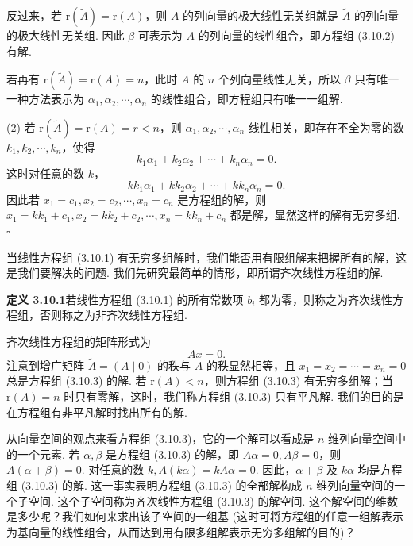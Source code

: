\documentclass[UTF8, 12pt, fontset=fandol, oneside]{ctexart}
\begin{document}
反过来，若 $\mathrm{r}(\widetilde{A})=\mathrm{r}(A)$，则 $A$ 的列向量的极大线性无关组就是 $\widetilde{A}$ 的列向量的极大线性无关组. 因此 $\beta$ 可表示为 $A$ 的列向量的线性组合，即方程组 (3.10.2) 有解.

若再有 $\mathrm{r}(\widetilde{A})=\mathrm{r}(A)=n$，此时 $A$ 的 $n$ 个列向量线性无关，所以 $\beta$ 只有唯一一种方法表示为 $\alpha_1,\alpha_2,\cdots,\alpha_n$ 的线性组合，即方程组只有唯一一组解.

(2) 若 $\mathrm{r}(\widetilde{A})=\mathrm{r}(A)=r<n$，则 $\alpha_1,\alpha_2,\cdots,\alpha_n$ 线性相关，即存在不全为零的数 $k_1,k_2,\cdots,k_n$，使得
\[
k_1\alpha_1+k_2\alpha_2+\cdots+k_n\alpha_n=0.
\]
这时对任意的数 $k$，
\[
kk_1\alpha_1+kk_2\alpha_2+\cdots+kk_n\alpha_n=0.
\]
因此若 $x_1=c_1,x_2=c_2,\cdots,x_n=c_n$ 是方程组的解，则 $x_1=kk_1+c_1,x_2=kk_2+c_2,\cdots,x_n=kk_n+c_n$ 都是解，显然这样的解有无穷多组. $\square$

当线性方程组 (3.10.1) 有无穷多组解时，我们能否用有限组解来把握所有的解，这是我们要解决的问题. 我们先研究最简单的情形，即所谓齐次线性方程组的解.

\noindent\textbf{定义 3.10.1}\quad 若线性方程组 (3.10.1) 的所有常数项 $b_i$ 都为零，则称之为齐次线性方程组，否则称之为非齐次线性方程组.

齐次线性方程组的矩阵形式为
\begin{equation}
Ax=0.
\tag{3.10.3}
\end{equation}
注意到增广矩阵 $\widetilde{A}=(A\mid 0)$ 的秩与 $A$ 的秩显然相等，且 $x_1=x_2=\cdots=x_n=0$ 总是方程组 (3.10.3) 的解. 若 $\mathrm{r}(A)<n$，则方程组 (3.10.3) 有无穷多组解；当 $\mathrm{r}(A)=n$ 时只有零解，这时，我们称方程组 (3.10.3) 只有平凡解. 我们的目的是在方程组有非平凡解时找出所有的解.

从向量空间的观点来看方程组 (3.10.3)，它的一个解可以看成是 $n$ 维列向量空间中的一个元素. 若 $\alpha,\beta$ 是方程组 (3.10.3) 的解，即 $A\alpha=0,A\beta=0$，则 $A(\alpha+\beta)=0$. 对任意的数 $k,A(k\alpha)=kA\alpha=0$. 因此，$\alpha+\beta$ 及 $k\alpha$ 均是方程组 (3.10.3) 的解. 这一事实表明方程组 (3.10.3) 的全部解构成 $n$ 维列向量空间的一个子空间. 这个子空间称为齐次线性方程组 (3.10.3) 的解空间. 这个解空间的维数是多少呢？我们如何来求出该子空间的一组基 (这时可将方程组的任意一组解表示为基向量的线性组合，从而达到用有限多组解表示无穷多组解的目的)？
\end{document}
